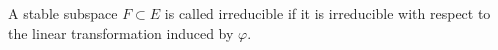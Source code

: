 A stable subspace $F \subset E$ is called irreducible if it is irreducible with respect to the linear transformation induced by $\varphi$.
